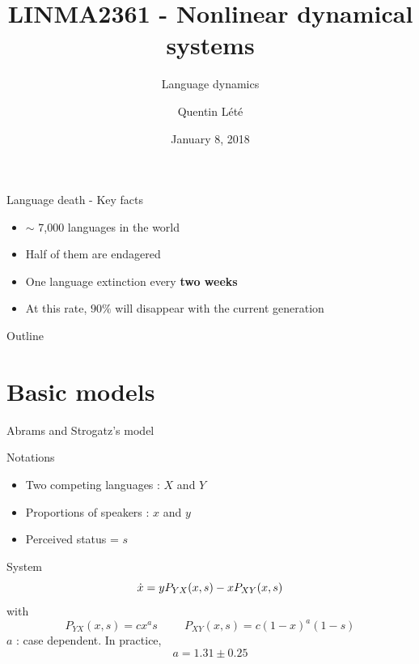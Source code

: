\documentclass[10pt]{beamer}
\title{LINMA2361 - Nonlinear dynamical systems}
\subtitle{Language dynamics}
\date{January 8, 2018}
\author{Quentin Lété}
\institute{Ecole polytechnique de Louvain}
\begin{document}
\maketitle


\begin{frame}{Language death - Key facts}
\begin{itemize}
\item $\sim$ 7,000 languages in the world
\item Half of them are endagered
\item One language extinction every \textbf{two weeks}
\item At this rate, $90\%$ will disappear with the current generation
\end{itemize}
\end{frame}


\begin{frame}{Outline}
  \tableofcontents
\end{frame}

\section{Basic models}

\begin{frame}{Abrams and Strogatz's model}
\begin{alertblock}{Notations}
\begin{itemize}
\item Two competing languages : $X$ and $Y$
\item Proportions of speakers : $x$ and $y$
\item Perceived status = $s$
\end{itemize}
\end{alertblock}

\begin{exampleblock}{System}
$$\dot{x} = yP_{YX}(x, s) - xP_{XY}(x, s)$$
with
\[ P_{YX}(x,s) = cx^as \hspace{1cm} P_{XY}(x,s) = c(1-x)^a(1-s) \]
$a$ : case dependent. In practice,
$$a = 1.31 \pm 0.25$$
\end{exampleblock}
\end{frame}
\end{document}
